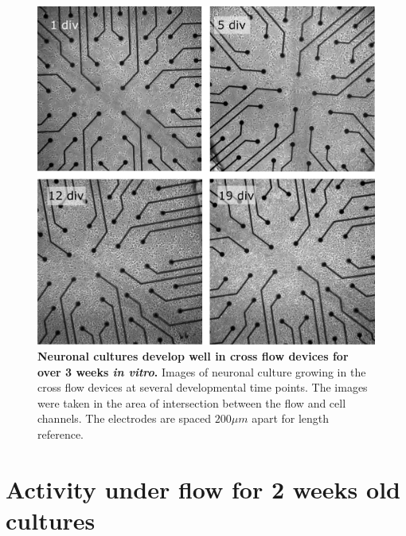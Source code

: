   \begin{figure}[!htb]
       \centering
       \includegraphics[width=15cm]{chapter5/figures/crossFlowDev/culture.jpg}
       \caption[Images of a neuronal culture growing in cross flow devices]{\textbf{Neuronal cultures develop well in cross flow devices for over 3 weeks \textit{in vitro}.} Images of neuronal culture growing in the cross flow devices at several developmental time points. The images were taken in the area of intersection between the flow and cell channels. The electrodes are spaced \(200 \mu m\) apart for length reference.}
       \label{fig:crossFlow:crossFlowDev}
  \end{figure}


\section{Activity under flow for 2 weeks old cultures}


